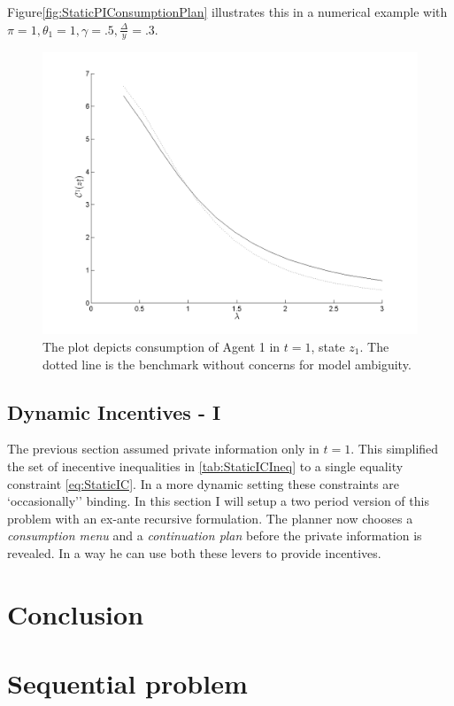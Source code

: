 \documentclass[12pt]{article}
\begin{document}
Figure{\ref{fig:StaticPIConsumptionPlan}} illustrates this in a numerical example with $\pi=1,\theta_1=1,\gamma=.5,\frac{\Delta}{y}=.3$.
\begin{figure}[htbp]
\centering
	  \includegraphics[scale=0.5]{Matlab/PrivateInformation/Plots/StaticPIConsumptionPlan.png}

	\caption{The plot depicts consumption of Agent 1 in $t=1$, state $z_1$. The dotted line is the benchmark without concerns for model ambiguity.}
	\label{fig:BondEconomyOucomes}
\end{figure} 
\subsection{Dynamic Incentives - I}
The previous section assumed private information only in $t=1$. This simplified the set of inecentive inequalities in \ref{tab:StaticICIneq} to a single equality constraint \ref{eq:StaticIC}. In a more dynamic setting these constraints are `occasionally'' binding. In this section I will setup a two period version of this problem with an ex-ante recursive formulation. The planner now chooses a \emph{consumption menu} and a \emph{continuation plan} before the private information is revealed. In a way he can use both these levers to provide incentives. 

\section{Conclusion}

\appendix
\section{Sequential problem}
\end{document}
